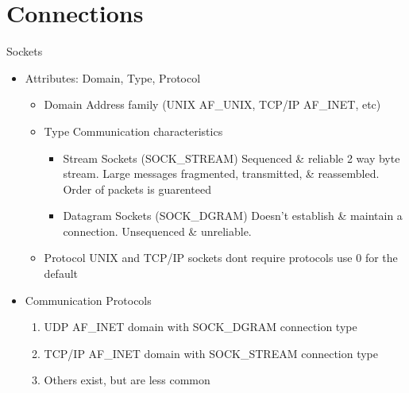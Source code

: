 \section{Connections}
\begin{questions}{Sockets}
	\begin{questionAnswer}
	\end{questionAnswer}

	\begin{itemize}
		\item Attributes: Domain, Type, Protocol
			\begin{itemize}
				\item Domain \ra Address family (UNIX \ra AF\_UNIX, TCP/IP \ra AF\_INET, etc)
				\item Type \ra Communication characteristics
					\begin{itemize}
						\item Stream Sockets (SOCK\_STREAM) \ra Sequenced \& reliable 2 way byte stream. Large messages fragmented, transmitted, \& reassembled. Order of packets is guarenteed
						\item Datagram Sockets (SOCK\_DGRAM) \ra Doesn't establish \& maintain a connection. Unsequenced \& unreliable.
					\end{itemize}
				\item Protocol \ra UNIX and TCP/IP sockets dont require protocols \ra use 0 for the default
			\end{itemize}
		\item Communication Protocols
			\begin{enumerate}
				\item UDP \ra AF\_INET domain with SOCK\_DGRAM connection type
				\item TCP/IP \ra AF\_INET domain with SOCK\_STREAM connection type
				\item Others exist, but are less common
			\end{enumerate}
	\end{itemize}
\end{questions}

